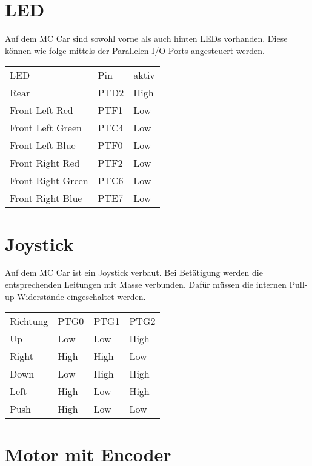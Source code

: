 \documentclass[a4paper,10pt,fleqn]{article}
\begin{document}
\section{LED}
Auf dem MC Car sind sowohl vorne als auch hinten LEDs vorhanden. Diese können 
wie folge mittels der Parallelen I/O Ports angesteuert werden. \\
\begin{table}[h!]
\begin{tabular}{lll}
\rowcolor{white} LED                 & Pin   & aktiv \\
\rowcolor{lgray} Rear                & PTD2  & High  \\
\rowcolor{white} Front Left  Red     & PTF1  & Low   \\
\rowcolor{lgray} Front Left  Green   & PTC4  & Low   \\
\rowcolor{white} Front Left  Blue    & PTF0  & Low   \\
\rowcolor{lgray} Front Right Red     & PTF2  & Low   \\
\rowcolor{white} Front Right Green   & PTC6  & Low   \\
\rowcolor{lgray} Front Right Blue    & PTE7  & Low   \\
\end{tabular}
\end{table}

\section{Joystick}
Auf dem MC Car ist ein Joystick verbaut. Bei Betätigung werden die 
entsprechenden Leitungen mit Masse verbunden. Dafür müssen die internen 
Pull-up Widerstände eingeschaltet werden. 
\begin{table}[h!]
\begin{tabular}{llll}
\rowcolor{white} Richtung    & PTG0  & PTG1  & PTG2  \\
\rowcolor{lgray} Up          & Low   & Low   & High  \\
\rowcolor{white} Right       & High  & High  & Low   \\
\rowcolor{lgray} Down        & Low   & High  & High  \\
\rowcolor{white} Left        & High  & Low   & High  \\
\rowcolor{lgray} Push        & High  & Low   & Low   \\
\end{tabular}
\end{table}

\section{Motor mit Encoder}
\end{document}
